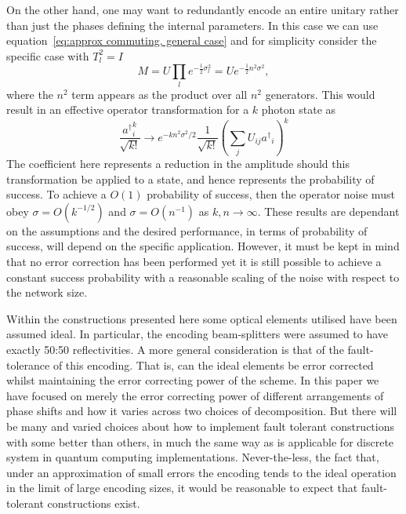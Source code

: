 \documentclass[aps,pra,twocolumn,superscriptaddress,numerical,floatfix]{revtex4-1}
\begin{document}
On the other hand, one may want to redundantly encode an entire unitary rather than just the phases defining the internal parameters.  In this case we can use equation~\ref{eq:approx commuting, general case} and for simplicity consider the specific case with $T_l^2= I$
\begin{equation}
	M = U \prod_l e^{-\frac{1}{2}\sigma_l^2} = U e^{-\frac{1}{2} n^2 \sigma^2},
\end{equation}
where the $n^2$ term appears as the product over all $n^2$ generators.
This would result in an effective operator transformation for a $k$ photon state as
\begin{equation}
	\frac{{a^\dagger}_i^{k}}{\sqrt{k!}} \rightarrow 
	e^{-k n^2 \sigma^2/2} \frac{1}{\sqrt{k!}} \left(\sum_j U_{ij} {a^\dagger}_i \right)^k
\end{equation}
The coefficient here represents a reduction in the amplitude should this transformation be applied to a state, and hence represents the probability of success. To achieve a $O(1)$ probability of success, then the operator noise must obey $\sigma = O(k^{-1/2})$ and $\sigma = O(n^{-1})$ as $k,n \rightarrow \infty$.  These results are dependant on the assumptions and the desired performance, in terms of probability of success, will depend on the specific application.  However, it must be kept in mind that no error correction has been performed yet it is still possible to achieve a constant success probability with a reasonable scaling of the noise with respect to the network size. 

Within the constructions presented here some optical elements utilised have been assumed ideal.  In particular, the encoding beam-splitters were assumed to have exactly 50:50 reflectivities.  A more general consideration is that of the fault-tolerance of this encoding.  That is, can the ideal elements be error corrected whilst maintaining the error correcting power of the scheme.   In this paper we have focused on merely the error correcting power of different arrangements of phase shifts and how it varies across two choices of decomposition.  But there will be many and varied choices about how to implement fault tolerant constructions with some better than others, in much the same way as is applicable for discrete system in quantum computing implementations.  Never-the-less, the fact that, under an approximation of small errors the encoding tends to the ideal operation in the limit of large encoding sizes, it would be reasonable to expect that fault-tolerant constructions exist.  
\end{document}
